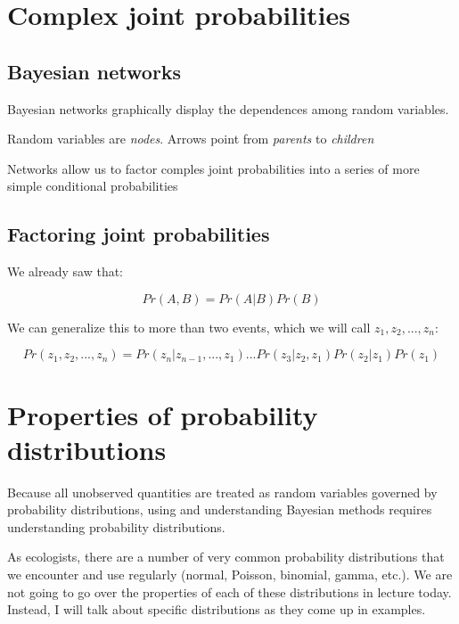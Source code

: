\documentclass[]{article}
\begin{document}
\hypertarget{complex-joint-probabilities}{%
\section{Complex joint
probabilities}\label{complex-joint-probabilities}}

\hypertarget{bayesian-networks}{%
\subsection{Bayesian networks}\label{bayesian-networks}}

Bayesian networks graphically display the dependences among random
variables.

Random variables are \emph{nodes}. Arrows point from \emph{parents} to
\emph{children}

Networks allow us to factor comples joint probabilities into a series of
more simple conditional probabilities

\hypertarget{factoring-joint-probabilities}{%
\subsection{Factoring joint
probabilities}\label{factoring-joint-probabilities}}

We already saw that:

\[Pr(A, B) = Pr(A|B)Pr(B)\]

We can generalize this to more than two events, which we will call
\(z_1, z_2,...,z_n\):

\[Pr(z_1, z_2,...,z_n) = Pr(z_n|z_{n-1},...,z_1)...Pr(z_3|z_2, z_1)Pr(z_2|z_1)Pr(z_1)\]

\hypertarget{properties-of-probability-distributions}{%
\section{Properties of probability
distributions}\label{properties-of-probability-distributions}}

Because all unobserved quantities are treated as random variables
governed by probability distributions, using and understanding Bayesian
methods requires understanding probability distributions.

As ecologists, there are a number of very common probability
distributions that we encounter and use regularly (normal, Poisson,
binomial, gamma, etc.). We are not going to go over the properties of
each of these distributions in lecture today. Instead, I will talk about
specific distributions as they come up in examples.
\end{document}
